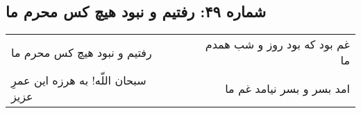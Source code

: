 \begin{center}
\section*{شماره ۴۹: رفتیم و نبود هیچ کس محرم ما}
\label{sec:049}
\begin{longtable}{l p{0.5cm} r}
رفتیم و نبود هیچ کس محرم ما
&&
غم بود که بود روز و شب همدم ما
\\
سبحان اللّه! به هرزه این عمرِ عزیز
&&
امد بسر و بسر نیامد غم ما
\\
\end{longtable}
\end{center}
